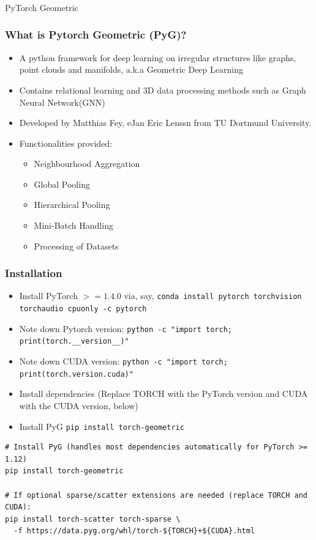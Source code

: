 \begin{frame}[fragile]\frametitle{}
\begin{center}
{\Large PyTorch Geometric}
\end{center}
\end{frame}


\begin{frame}[fragile]\frametitle{What is Pytorch Geometric (PyG)?}

\begin{itemize}
\item A python framework for deep learning on irregular structures like graphs, point clouds and manifolds, a.k.a Geometric Deep Learning 
\item Contains relational learning and 3D data processing methods such as Graph Neural Network(GNN)
\item Developed by Matthias Fey, eJan Eric Lenssn from TU Dortmund University. 
\item Functionalities provided:
	\begin{itemize}
	\item Neighbourhood Aggregation
	\item Global Pooling
	\item Hierarchical Pooling
	\item Mini-Batch Handling
	\item Processing of Datasets
	\end{itemize}
\end{itemize}

\end{frame}

\begin{frame}[fragile]\frametitle{Installation}

\begin{itemize}
\item Install PyTorch $>= 1.4.0$ via, say, \lstinline|conda install pytorch torchvision torchaudio cpuonly -c pytorch|
\item Note down Pytorch version: \lstinline|python -c "import torch; print(torch.__version__)"|
\item Note down CUDA version: \lstinline|python -c "import torch; print(torch.version.cuda)"|
\item Install dependencies (Replace TORCH with the PyTorch version and CUDA with the CUDA version, below)
\item Install PyG \lstinline|pip install torch-geometric|
\end{itemize}

\begin{lstlisting}
# Install PyG (handles most dependencies automatically for PyTorch >= 1.12)
pip install torch-geometric

# If optional sparse/scatter extensions are needed (replace TORCH and CUDA):
pip install torch-scatter torch-sparse \
  -f https://data.pyg.org/whl/torch-${TORCH}+${CUDA}.html
\end{lstlisting}

\end{frame}

